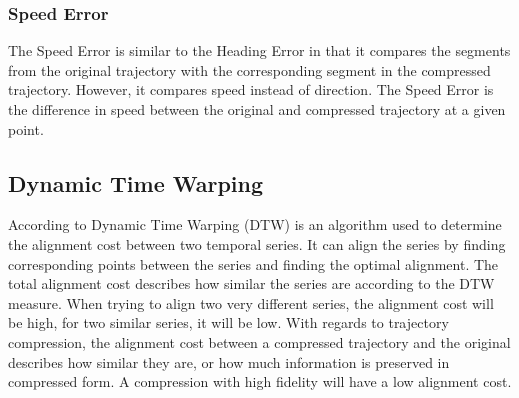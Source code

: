\subsubsection{Speed Error}
The Speed Error is similar to the Heading Error in that it compares the segments from the original trajectory with the corresponding segment in the compressed trajectory. However, it compares speed instead of direction. The Speed Error is the difference in speed between the original and compressed trajectory at a given point.

\subsection{Dynamic Time Warping}
According to \textcite{muller2007dynamic} Dynamic Time Warping (DTW) is an algorithm used to determine the alignment cost between two temporal series. It can align the series by finding corresponding points between the series and finding the optimal alignment. The total alignment cost describes how similar the series are according to the DTW measure. When trying to align two very different series, the alignment cost will be high, for two similar series, it will be low. With regards to trajectory compression, the alignment cost between a compressed trajectory and the original describes how similar they are, or how much information is preserved in compressed form. A compression with high fidelity will have a low alignment cost.

